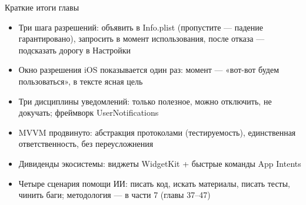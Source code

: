 \begin{tcbsummary}{Краткие итоги главы}
\begin{itemize}
  \item Три шага разрешений: объявить в Info.plist (пропустите — падение гарантировано), запросить в момент использования, после отказа — подсказать дорогу в Настройки
  \item Окно разрешения iOS показывается один раз: момент — «вот-вот будем пользоваться», в тексте ясная цель
  \item Три дисциплины уведомлений: только полезное, можно отключить, не докучать; фреймворк UserNotifications
  \item MVVM продвинуто: абстракция протоколами (тестируемость), единственная ответственность, без переусложнения
  \item Дивиденды экосистемы: виджеты WidgetKit + быстрые команды App Intents
  \item Четыре сценария помощи ИИ: писать код, искать материалы, писать тесты, чинить баги; методология — в части 7 (главы 37–47)
\end{itemize}

\end{tcbsummary}

